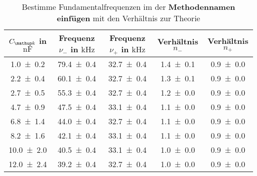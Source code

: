 \begin{table} 
\centering 
\caption{ Bestimme Fundamentalfrequenzen im der \textbf{Methodennamen einfügen} mit den Verhältnis zur Theorie} 
\label{teilc_schwingungen_prak_theo} 
\begin{tabular}{S S S S S } 
\toprule  
{$C\ua{k}$ in $\si{\nano\farad}$} & {Frequenz $\nu_-$ in $\si{\kilo\hertz}$} & {Frequenz $\nu_+$ in $\si{\kilo\hertz}$ }& {Verhältnis $n_-$} & {Verhältnis $n_+$}  \\ 
\midrule  
 \num{1.0\pm0.2} & \num{79.4\pm0.4} & \num{32.7\pm0.4} & \num{1.4\pm0.1} & \num{0.9\pm0.0}\\ 
\num{2.2\pm0.4} & \num{60.1\pm0.4} & \num{32.7\pm0.4} & \num{1.3\pm0.1} & \num{0.9\pm0.0}\\ 
\num{2.7\pm0.5} & \num{55.3\pm0.4} & \num{32.7\pm0.4} & \num{1.2\pm0.0} & \num{0.9\pm0.0}\\ 
\num{4.7\pm0.9} & \num{47.5\pm0.4} & \num{33.1\pm0.4} & \num{1.1\pm0.0} & \num{0.9\pm0.0}\\ 
\num{6.8\pm1.4} & \num{44.0\pm0.4} & \num{32.7\pm0.4} & \num{1.1\pm0.0} & \num{0.9\pm0.0}\\ 
\num{8.2\pm1.6} & \num{42.1\pm0.4} & \num{33.1\pm0.4} & \num{1.1\pm0.0} & \num{0.9\pm0.0}\\ 
\num{10.0\pm2.0} & \num{40.5\pm0.4} & \num{33.1\pm0.4} & \num{1.0\pm0.0} & \num{0.9\pm0.0}\\ 
\num{12.0\pm2.4} & \num{39.2\pm0.4} & \num{32.7\pm0.4} & \num{1.0\pm0.0} & \num{0.9\pm0.0}\\ 
\bottomrule 
\end{tabular} 
\end{table}